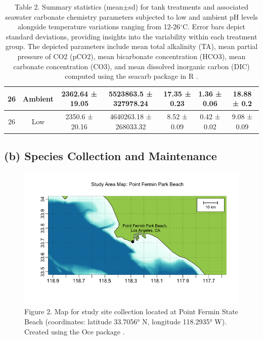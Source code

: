 \documentclass[
  12pt,
]{article}
\begin{document}
\begin{table}[!ht]
\begin{tabular}{|c|c|c|c|c|c|c|}
        26 & Ambient & 2362.64 ± 19.05 & 5523863.5 ± 327978.24 & 17.35 ± 0.23 & 1.36 ± 0.06 & 18.88 ± 0.2 \\ \hline
        26 & Low & 2350.6 ± 20.16 & 4640263.18 ± 268033.32 & 8.52 ± 0.09 & 0.42 ± 0.02 & 9.08 ± 0.09 \\ \hline
    \end{tabular}
    \caption{Table 2. Summary statistics (mean$\pm$sd) for tank treatments and associated seawater carbonate chemistry parameters subjected to low and ambient pH levels alongside temperature variations ranging from 12-26$^\circ$C. Error bars depict standard deviations, providing insights into the variability within each treatment group. The depicted parameters include mean total alkalinity (TA), mean partial pressure of CO2 (pCO2), mean bicarbonate concentration (HCO3), mean carbonate concentration (CO3), and mean dissolved inorganic carbon (DIC) computed using the seacarb package in R \citep{gattuso2015package}.}
    \label{carbonate-stat-summary}
\end{table}

\hypertarget{b-species-collection-and-maintenance}{%
\subsection{(b) Species Collection and
Maintenance}\label{b-species-collection-and-maintenance}}

\begin{figure}[htbp]
    \centering
    \includegraphics[width=1\textwidth]{Images/map.png}
    \caption{Figure 2. Map for study site collection located at Point Fermin State Beach (coordinates: latitude 33.7056° N, longitude 118.2935° W). Created using the Oce package \citep{kelley2018oce}.}
    \label{fig:study-site-map}
\end{figure}
\end{document}
